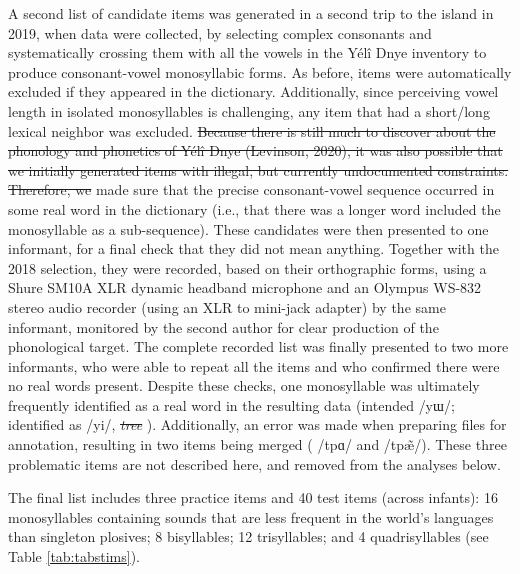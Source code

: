 \documentclass[ %
american, %
,man,floatsintext]{apa6} %
\providecommand{\DIFaddtex}[1]{{\protect\color{blue}\uwave{#1}}} %
\providecommand{\DIFdeltex}[1]{{\protect\color{red}\sout{#1}}}                      %
\providecommand{\DIFaddbegin}{} %
\providecommand{\DIFaddend}{} %
\providecommand{\DIFdelbegin}{} %
\providecommand{\DIFdelend}{} %
\providecommand{\DIFadd}[1]{\texorpdfstring{\DIFaddtex{#1}}{#1}} %
\providecommand{\DIFdel}[1]{\texorpdfstring{\DIFdeltex{#1}}{}} %
\newcommand{\DIFscaledelfig}{0.5}
\newlength{\DIFdelgraphicswidth} %
\newlength{\DIFdelgraphicsheight} %
\newcommand{\DIFaddincludegraphics}[2][]{{\color{blue}\fbox{\DIFOincludegraphics[#1]{#2}}}} %
\newcommand{\DIFdelincludegraphics}[2][]{%
	\sbox{\DIFdelgraphicsbox}{\DIFOincludegraphics[#1]{#2}}%
	\settoboxwidth{\DIFdelgraphicswidth}{\DIFdelgraphicsbox} %
	\settoboxtotalheight{\DIFdelgraphicsheight}{\DIFdelgraphicsbox} %
	\scalebox{\DIFscaledelfig}{%
		\parbox[b]{\DIFdelgraphicswidth}{\usebox{\DIFdelgraphicsbox}\\[-\baselineskip] \rule{\DIFdelgraphicswidth}{0em}}\llap{\resizebox{\DIFdelgraphicswidth}{\DIFdelgraphicsheight}{%
				\setlength{\unitlength}{\DIFdelgraphicswidth}%
				\begin{picture}(1,1)%
				\thicklines\linethickness{2pt} %
				{\color[rgb]{1,0,0}\put(0,0){\framebox(1,1){}}}%
				{\color[rgb]{1,0,0}\put(0,0){\line( 1,1){1}}}%
				{\color[rgb]{1,0,0}\put(0,1){\line(1,-1){1}}}%
				\end{picture}%
			}\hspace*{3pt}}} %
} %
\DeclareRobustCommand{\DIFaddbegin}{\DIFOaddbegin \let\includegraphics\DIFaddincludegraphics} %
\DeclareRobustCommand{\DIFaddend}{\DIFOaddend \let\includegraphics\DIFOincludegraphics} %
\DeclareRobustCommand{\DIFdelbegin}{\DIFOdelbegin \let\includegraphics\DIFdelincludegraphics} %
\DeclareRobustCommand{\DIFdelend}{\DIFOaddend \let\includegraphics\DIFOincludegraphics} %
\begin{document}
A second list of candidate items was generated in a second trip to the island in 2019, when data were collected, by selecting complex consonants and systematically crossing them with all the vowels in the Yélî Dnye inventory to produce consonant-vowel monosyllabic forms. As before, items were automatically excluded if they appeared in the dictionary. Additionally, since perceiving vowel length in isolated monosyllables is challenging, any item that had a short/long lexical neighbor was excluded. \DIFdelbegin \DIFdel{Because there is still much to discover about the phonology and phonetics of Yélî Dnye (Levinson, 2020), it was also possible that we initially generated items with illegal, but currently undocumented constraints. Therefore, we }\DIFdelend \DIFaddbegin \DIFadd{Additionally, we }\DIFaddend made sure that the precise consonant-vowel sequence occurred in some real word in the dictionary (i.e., that there was a longer word included the monosyllable as a sub-sequence). These candidates were then presented to one informant, for a final check that they did not mean anything. Together with the 2018 selection, they were recorded, based on their orthographic forms, using a Shure SM10A XLR dynamic headband microphone and an Olympus WS-832 stereo audio recorder (using an XLR to mini-jack adapter) by the same informant, monitored by the second author for clear production of the phonological target. The complete recorded list was finally presented to two more informants, who were able to repeat all the items and who confirmed there were no real words present. Despite these checks, one monosyllable was ultimately frequently identified as a real word in the resulting data (intended \DIFdelbegin %
\DIFdelend \DIFaddbegin \emph{\DIFadd{yî}} \DIFaddend /yɯ/; identified as \DIFdelbegin %
\DIFdelend \DIFaddbegin \emph{\DIFadd{yi}} \DIFaddend /yi/, \DIFdelbegin \emph{\DIFdel{tree}}%
\DIFdelend \DIFaddbegin \DIFadd{`tree'}\DIFaddend ). Additionally, an error was made when preparing files for annotation, resulting in two items being merged (\DIFdelbegin %
\DIFdelend \DIFaddbegin \emph{\DIFadd{tpâ}} \DIFaddend /tpɑ/ and \DIFdelbegin %
\DIFdelend \DIFaddbegin \emph{\DIFadd{tp:a}} \DIFaddend /tpæ̃/). These three problematic items are not described here, and removed from the analyses below.

The final list includes three practice items and 40 test items (across infants): 16 monosyllables containing sounds that are less frequent in the world's languages than singleton plosives; 8 bisyllables; 12 trisyllables; and 4 quadrisyllables (see Table \ref{tab:tabstims}).
\end{document}
